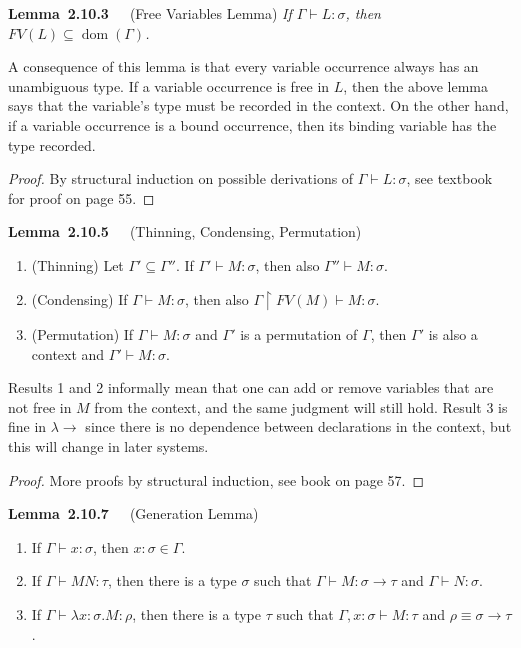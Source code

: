 \documentclass[letterpaper]{article}
\newenvironment{lemma}[2][]{\par\medskip
	\noindent \textbf{Lemma~#2}~~~#1 \rmfamily\em}{\medskip}
\renewcommand{\l}{\lambda}
\newcommand{\larr}{\lambda \!\! \rightarrow}
\DeclareMathOperator{\dom}{dom}
\newcommand{\proj}{\upharpoonright}
\begin{document}
\begin{lemma}[(Free Variables Lemma)]{2.10.3}
	If $\Gamma \vdash L : \sigma$, then $FV(L) \subseteq \dom(\Gamma)$.
\end{lemma}

A consequence of this lemma is that every variable occurrence always has an unambiguous type. If a variable occurrence is free in $L$, then the above lemma says that the variable's type must be recorded in the context. On the other hand, if a variable occurrence is a bound occurrence, then its binding variable has the type recorded.

\begin{proof}
	By structural induction on possible derivations of $\Gamma \vdash L : \sigma$, see textbook for proof on page 55.
\end{proof}

\begin{lemma}[(Thinning, Condensing, Permutation)]{2.10.5}
	\begin{enumerate}
		\item (Thinning) Let $\Gamma' \subseteq \Gamma''$. If $\Gamma' \vdash M : \sigma$, then also $\Gamma'' \vdash M : \sigma$.
		\item (Condensing) If $\Gamma \vdash M : \sigma$, then also $\Gamma \proj FV(M) \vdash M : \sigma$.
		\item (Permutation) If $\Gamma \vdash M : \sigma$ and $\Gamma'$ is a permutation of $\Gamma$, then $\Gamma'$ is also a context and $\Gamma' \vdash M : \sigma$.
	\end{enumerate}
\end{lemma}

Results 1 and 2 informally mean that one can add or remove variables that are not free in $M$ from the context, and the same judgment will still hold. Result 3 is fine in $\larr$ since there is no dependence between declarations in the context, but this will change in later systems.

\begin{proof}
	More proofs by structural induction, see book on page 57.
\end{proof}

\begin{lemma}[(Generation Lemma)]{2.10.7}
	\begin{enumerate}
		\item If $\Gamma \vdash x : \sigma$, then $x : \sigma \in \Gamma$.
		\item If $\Gamma \vdash M N : \tau$, then there is a type $\sigma$ such that $\Gamma \vdash M : \sigma \to \tau$ and $\Gamma \vdash N : \sigma$.
		\item If $\Gamma \vdash \l x : \sigma . M : \rho$, then there is a type $\tau$ such that $\Gamma, x : \sigma \vdash M : \tau$ and $\rho \equiv \sigma \to \tau$.
	\end{enumerate}
\end{lemma}
\end{document}

